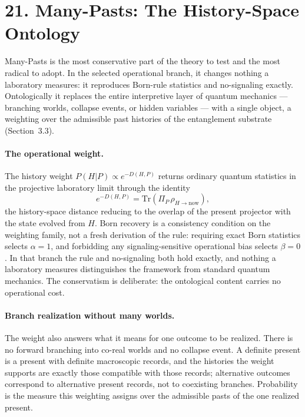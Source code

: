 \documentclass[11pt]{article}
\begin{document}
\section{21. Many-Pasts: The History-Space Ontology}

Many-Pasts is the most conservative part of the theory to test and the most radical to adopt. In the selected operational branch, it changes nothing a laboratory measures: it reproduces Born-rule statistics and no-signaling exactly. Ontologically it replaces the entire interpretive layer of quantum mechanics --- branching worlds, collapse events, or hidden variables --- with a single object, a weighting over the admissible past histories of the entanglement substrate (Section~3.3).

\paragraph{The operational weight.}
The history weight $P(H|P)\propto e^{-D(H,P)}$ returns ordinary quantum statistics in the projective laboratory limit through the identity
\[
e^{-D(H,P)}=\mathrm{Tr}\!\left(\Pi_P\,\rho_{H\to\mathrm{now}}\right),
\]
the history-space distance reducing to the overlap of the present projector with the state evolved from $H$. Born recovery is a consistency condition on the weighting family, not a fresh derivation of the rule: requiring exact Born statistics selects $\alpha=1$, and forbidding any signaling-sensitive operational bias selects $\beta=0$. In that branch the rule and no-signaling both hold exactly, and nothing a laboratory measures distinguishes the framework from standard quantum mechanics. The conservatism is deliberate: the ontological content carries no operational cost.

\paragraph{Branch realization without many worlds.}
The weight also answers what it means for one outcome to be realized. There is no forward branching into co-real worlds and no collapse event. A definite present is a present with definite macroscopic records, and the histories the weight supports are exactly those compatible with those records; alternative outcomes correspond to alternative present records, not to coexisting branches. Probability is the measure this weighting assigns over the admissible pasts of the one realized present.
\end{document}
